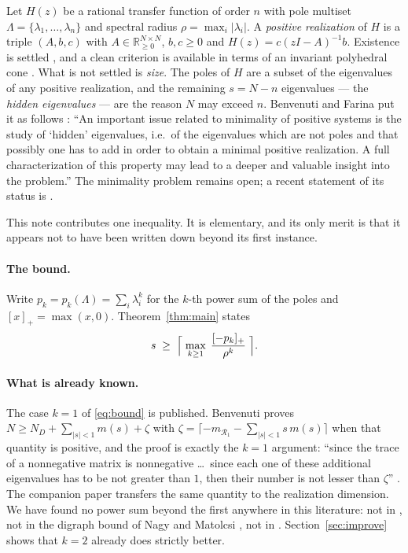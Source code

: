 \documentclass[11pt]{article}
\theoremstyle{plain}
\theoremstyle{remark}
\newcommand{\R}{\mathbb{R}}
\begin{document}
Let $H(z)$ be a rational transfer function of order $n$ with pole multiset
$\Lambda=\{\lambda_1,\dots,\lambda_n\}$ and spectral radius
$\rho=\max_i|\lambda_i|$. A \emph{positive realization} of $H$ is a triple
$(A,b,c)$ with $A\in\R_{\ge0}^{N\times N}$, $b,c\ge0$ and
$H(z)=c(zI-A)^{-1}b$. Existence is settled \cite{Farina96,ADFB96,OMK84}, and a clean
criterion is available in terms of an invariant polyhedral cone \cite{BF04}. What is not
settled is \emph{size}. The poles of $H$ are a subset of the eigenvalues of any positive
realization, and the remaining $s=N-n$ eigenvalues --- the \emph{hidden eigenvalues} --- are
the reason $N$ may exceed $n$. Benvenuti and Farina put it as follows
\cite[\S IX]{BF04}: ``An important issue related to minimality of positive systems is the
study of `hidden' eigenvalues, i.e.\ of the eigenvalues which are not poles and that
possibly one has to add in order to obtain a minimal positive realization. A full
characterization of this property may lead to a deeper and valuable insight into the
problem.'' The minimality problem remains open; a recent statement of its status is
\cite{TS25}.

This note contributes one inequality. It is elementary, and its only merit is that it
appears not to have been written down beyond its first instance.

\paragraph{The bound.} Write $p_k=p_k(\Lambda)=\sum_{i}\lambda_i^{k}$ for the $k$-th power
sum of the poles and $[x]_+=\max(x,0)$. Theorem~\ref{thm:main} states
\begin{equation}\label{eq:bound}
s\;\ge\;\Bigl\lceil\;\max_{k\ge1}\;\frac{[-p_k]_+}{\rho^{k}}\;\Bigr\rceil .
\end{equation}

\paragraph{What is already known.} The case $k=1$ of \eqref{eq:bound} is published.
Benvenuti \cite[Thm.~4.7]{Ben20ELA} proves $N\ge N_D+\sum_{|s|<1}m(s)+\zeta$ with
$\zeta=\lceil-m_{\mathcal R_1}-\sum_{|s|<1}s\,m(s)\rceil$ when that quantity is positive,
and the proof is exactly the $k=1$ argument: ``since the trace of a nonnegative matrix is
nonnegative \dots\ since each one of these additional eigenvalues has to be not greater
than $1$, then their number is not lesser than $\zeta$''
\cite[pp.~379--380]{Ben20ELA}. The companion paper \cite{Ben20SCL} transfers the same
quantity to the realization dimension. We have found no power sum beyond the first
anywhere in this literature: not in \cite{Ben20ELA,Ben20SCL}, not in the digraph bound of
Nagy and Matolcsi \cite{NM03}, not in \cite{BF04,TS25}. Section~\ref{sec:improve} shows
that $k=2$ already does strictly better.
\end{document}
